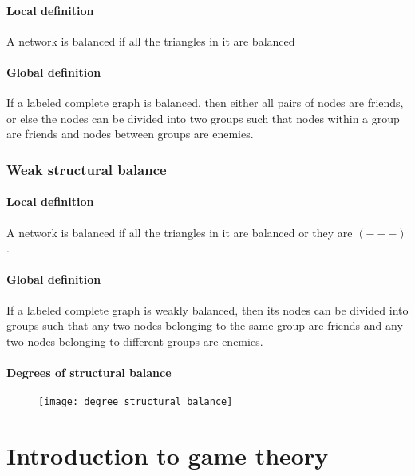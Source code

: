 \subsubsection{Local definition}

A network is balanced if all the triangles in it are balanced

\subsubsection{Global definition}

If a labeled complete graph is balanced, then either all pairs of nodes are friends, or else the nodes can be divided into two groups such that nodes within a group are friends and nodes between groups are enemies.

\subsection{Weak structural balance}

\subsubsection{Local definition}

A network is balanced if all the triangles in it are balanced or they are $(---)$.

\subsubsection{Global definition}

If a labeled complete graph is weakly balanced, then its nodes can be divided into groups such that any two nodes belonging to the same group are friends and any two nodes belonging to different groups are enemies.

\subsubsection{Degrees of structural balance}

\begin{figure}[H]
    \centering
    \texttt{[image: degree\_structural\_balance]}
\end{figure}

\chapter{Introduction to game theory}

